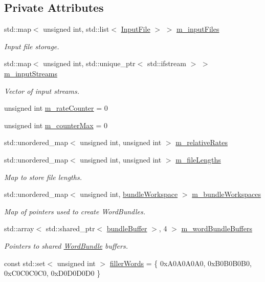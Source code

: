 \subsection*{Private Attributes}
\begin{DoxyCompactItemize}
\item 
std\+::map$<$ unsigned int, std\+::list$<$ \hyperlink{class_input_file}{Input\+File} $>$ $>$ \hyperlink{class_file_reader_a8b144dccc96fcc95e43a96a300341855}{m\+\_\+input\+Files}
\begin{DoxyCompactList}\small\item\em Input file storage. \end{DoxyCompactList}\item 
std\+::map$<$ unsigned int, std\+::unique\+\_\+ptr$<$ std\+::ifstream $>$ $>$ \hyperlink{class_file_reader_af7ac8567ed5b1fa022a8f98099e23f43}{m\+\_\+input\+Streams}
\begin{DoxyCompactList}\small\item\em Vector of input streams. \end{DoxyCompactList}\item 
unsigned int \hyperlink{class_file_reader_a2e6b51dae972af878f7751f2b6a54d75}{m\+\_\+rate\+Counter} = 0
\item 
unsigned int \hyperlink{class_file_reader_a7e3ce1501c6bd018d818aab3bfa18cdb}{m\+\_\+counter\+Max} = 0
\item 
std\+::unordered\+\_\+map$<$ unsigned int, unsigned int $>$ \hyperlink{class_file_reader_ab47bb74c4b6d3e038501cc93ec669d33}{m\+\_\+relative\+Rates}
\item 
std\+::unordered\+\_\+map$<$ unsigned int, unsigned int $>$ \hyperlink{class_file_reader_a2d560dd766f6866a1c11cc44e059c246}{m\+\_\+file\+Lengths}
\begin{DoxyCompactList}\small\item\em Map to store file lengths. \end{DoxyCompactList}\item 
std\+::unordered\+\_\+map$<$ unsigned int, \hyperlink{class_file_reader_a7fb625dc45cee3256d37cc19c65cad86}{bundle\+Workspace} $>$ \hyperlink{class_file_reader_aa04e6f9a40c9186cae2c89352e75d69c}{m\+\_\+bundle\+Workspaces}
\begin{DoxyCompactList}\small\item\em Map of pointers used to create Word\+Bundles. \end{DoxyCompactList}\item 
std\+::array$<$ std\+::shared\+\_\+ptr$<$ \hyperlink{class_file_reader_ac755c1e271610c2c12a7fc5b55cc048b}{bundle\+Buffer} $>$, 4 $>$ \hyperlink{class_file_reader_a038d1362d7e0458b3450ab8584eab688}{m\+\_\+word\+Bundle\+Buffers}
\begin{DoxyCompactList}\small\item\em Pointers to shared \hyperlink{class_word_bundle}{Word\+Bundle} buffers. \end{DoxyCompactList}\item 
const std\+::set$<$ unsigned int $>$ \hyperlink{class_file_reader_a7a0bb5e7cb117f6a415f005665893509}{filler\+Words} = \{ 0x\+A0\+A0\+A0\+A0, 0x\+B0\+B0\+B0\+B0, 0x\+C0\+C0\+C0\+C0, 0x\+D0\+D0\+D0\+D0 \}
\end{DoxyCompactItemize}



